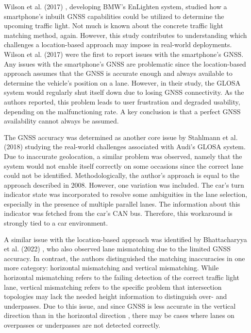 Wilson et al. (2017) \cite{wilson_driver_2017}, developing BMW's EnLighten system, studied how a smartphone's inbuilt GNSS capabilities could be utilized to determine the upcoming traffic light. Not much is known about the concrete traffic light matching method, again. However, this study contributes to understanding which challenges a location-based approach may impose in real-world deployments. Wilson et al. (2017) \cite{wilson_driver_2017} were the first to report issues with the smartphone's GNSS. Any issues with the smartphone's GNSS are problematic since the location-based approach assumes that the GNSS is accurate enough and always available to determine the vehicle's position on a lane. However, in their study, the GLOSA system would regularly shut itself down due to losing GNSS connectivity. As the authors reported, this problem leads to user frustration and degraded usability, depending on the malfunctioning rate. A key conclusion is that a perfect GNSS availability cannot always be assumed. 

The GNSS accuracy was determined as another core issue by Stahlmann et al. (2018) \cite{stahlmann_exploring_2018} studying the real-world challenges associated with Audi's GLOSA system. Due to inaccurate geolocation, a similar problem was observed, namely that the system would not enable itself correctly on some occasions since the correct lane could not be identified. Methodologically, the author's approach is equal to the approach described in 2008. However, one variation was included. The car's turn indicator state was incorporated to resolve some ambiguities in the lane selection, especially in the presence of multiple parallel lanes. The information about this indicator was fetched from the car's CAN bus. Therefore, this workaround is strongly tied to a car environment.

A similar issue with the location-based approach was identified by Bhattacharyya et al. (2022) \cite{bhattacharyya_assessing_2022}, who also observed lane mismatching due to the limited GNSS accuracy. In contrast, the authors distinguished the matching inaccuracies in one more category: horizontal mismatching and vertical mismatching. While horizontal mismatching refers to the failing detection of the correct traffic light lane, vertical mismatching refers to the specific problem that intersection topologies may lack the needed height information to distinguish over- and underpasses. Due to this issue, and since GNSS is less accurate in the vertical direction than in the horizontal direction \cite{khomsin_accuracy_2019}, there may be cases where lanes on overpasses or underpasses are not detected correctly.

